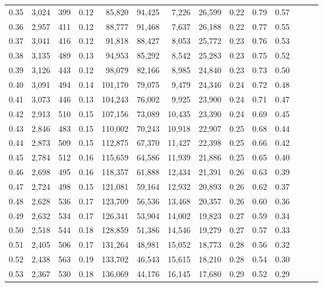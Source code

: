 \begin{tabular}{rrrrrrrrrrrrrr}
0.35 &  3,024 &    399 &  0.12 &   85,820 &   94,425 &   7,226 &  26,599 &  0.22 &  0.79 &      0.57 \\
0.36 &  2,957 &    411 &  0.12 &   88,777 &   91,468 &   7,637 &  26,188 &  0.22 &  0.77 &      0.55 \\
0.37 &  3,041 &    416 &  0.12 &   91,818 &   88,427 &   8,053 &  25,772 &  0.23 &  0.76 &      0.53 \\
0.38 &  3,135 &    489 &  0.13 &   94,953 &   85,292 &   8,542 &  25,283 &  0.23 &  0.75 &      0.52 \\
0.39 &  3,126 &    443 &  0.12 &   98,079 &   82,166 &   8,985 &  24,840 &  0.23 &  0.73 &      0.50 \\
0.40 &  3,091 &    494 &  0.14 &  101,170 &   79,075 &   9,479 &  24,346 &  0.24 &  0.72 &      0.48 \\
0.41 &  3,073 &    446 &  0.13 &  104,243 &   76,002 &   9,925 &  23,900 &  0.24 &  0.71 &      0.47 \\
0.42 &  2,913 &    510 &  0.15 &  107,156 &   73,089 &  10,435 &  23,390 &  0.24 &  0.69 &      0.45 \\
0.43 &  2,846 &    483 &  0.15 &  110,002 &   70,243 &  10,918 &  22,907 &  0.25 &  0.68 &      0.44 \\
0.44 &  2,873 &    509 &  0.15 &  112,875 &   67,370 &  11,427 &  22,398 &  0.25 &  0.66 &      0.42 \\
0.45 &  2,784 &    512 &  0.16 &  115,659 &   64,586 &  11,939 &  21,886 &  0.25 &  0.65 &      0.40 \\
0.46 &  2,698 &    495 &  0.16 &  118,357 &   61,888 &  12,434 &  21,391 &  0.26 &  0.63 &      0.39 \\
0.47 &  2,724 &    498 &  0.15 &  121,081 &   59,164 &  12,932 &  20,893 &  0.26 &  0.62 &      0.37 \\
0.48 &  2,628 &    536 &  0.17 &  123,709 &   56,536 &  13,468 &  20,357 &  0.26 &  0.60 &      0.36 \\
0.49 &  2,632 &    534 &  0.17 &  126,341 &   53,904 &  14,002 &  19,823 &  0.27 &  0.59 &      0.34 \\
0.50 &  2,518 &    544 &  0.18 &  128,859 &   51,386 &  14,546 &  19,279 &  0.27 &  0.57 &      0.33 \\
0.51 &  2,405 &    506 &  0.17 &  131,264 &   48,981 &  15,052 &  18,773 &  0.28 &  0.56 &      0.32 \\
0.52 &  2,438 &    563 &  0.19 &  133,702 &   46,543 &  15,615 &  18,210 &  0.28 &  0.54 &      0.30 \\
0.53 &  2,367 &    530 &  0.18 &  136,069 &   44,176 &  16,145 &  17,680 &  0.29 &  0.52 &      0.29 \\

\end{tabular}
